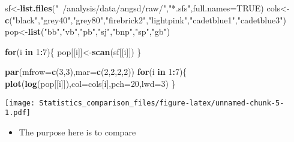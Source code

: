 \documentclass[]{article}
\newenvironment{Shaded}{\begin{snugshade}}{\end{snugshade}}
\newcommand{\KeywordTok}[1]{\textcolor[rgb]{0.13,0.29,0.53}{\textbf{#1}}}
\newcommand{\DataTypeTok}[1]{\textcolor[rgb]{0.13,0.29,0.53}{#1}}
\newcommand{\DecValTok}[1]{\textcolor[rgb]{0.00,0.00,0.81}{#1}}
\newcommand{\StringTok}[1]{\textcolor[rgb]{0.31,0.60,0.02}{#1}}
\newcommand{\OtherTok}[1]{\textcolor[rgb]{0.56,0.35,0.01}{#1}}
\newcommand{\ControlFlowTok}[1]{\textcolor[rgb]{0.13,0.29,0.53}{\textbf{#1}}}
\newcommand{\OperatorTok}[1]{\textcolor[rgb]{0.81,0.36,0.00}{\textbf{#1}}}
\newcommand{\NormalTok}[1]{#1}
\providecommand{\tightlist}{%
  \setlength{\itemsep}{0pt}\setlength{\parskip}{0pt}}
\begin{document}
\begin{Shaded}
\begin{Highlighting}[]
\NormalTok{sf<-}\KeywordTok{list.files}\NormalTok{(}\StringTok{"~/analysis/data/angsd/raw/"}\NormalTok{,}\StringTok{"*.sfs"}\NormalTok{,}\DataTypeTok{full.names=}\OtherTok{TRUE}\NormalTok{)}
\NormalTok{cols<-}\KeywordTok{c}\NormalTok{(}\StringTok{"black"}\NormalTok{,}\StringTok{"grey40"}\NormalTok{,}\StringTok{"grey80"}\NormalTok{,}\StringTok{"firebrick2"}\NormalTok{,}\StringTok{"lightpink"}\NormalTok{,}\StringTok{"cadetblue1"}\NormalTok{,}\StringTok{"cadetblue3"}\NormalTok{)}
\NormalTok{pop<-}\KeywordTok{list}\NormalTok{(}\StringTok{"bb"}\NormalTok{,}\StringTok{"vb"}\NormalTok{,}\StringTok{"pb"}\NormalTok{,}\StringTok{"sj"}\NormalTok{,}\StringTok{"bnp"}\NormalTok{,}\StringTok{"sp"}\NormalTok{,}\StringTok{"gb"}\NormalTok{)}

\ControlFlowTok{for}\NormalTok{(i }\ControlFlowTok{in} \DecValTok{1}\OperatorTok{:}\DecValTok{7}\NormalTok{)\{}
\NormalTok{  pop[[i]]<-}\KeywordTok{scan}\NormalTok{(sf[[i]])}
\NormalTok{\}}

\KeywordTok{par}\NormalTok{(}\DataTypeTok{mfrow=}\KeywordTok{c}\NormalTok{(}\DecValTok{3}\NormalTok{,}\DecValTok{3}\NormalTok{),}\DataTypeTok{mar=}\KeywordTok{c}\NormalTok{(}\DecValTok{2}\NormalTok{,}\DecValTok{2}\NormalTok{,}\DecValTok{2}\NormalTok{,}\DecValTok{2}\NormalTok{))}
\ControlFlowTok{for}\NormalTok{(i }\ControlFlowTok{in} \DecValTok{1}\OperatorTok{:}\DecValTok{7}\NormalTok{)\{}
  \KeywordTok{plot}\NormalTok{(}\KeywordTok{log}\NormalTok{(pop[[i]]),}\DataTypeTok{col=}\NormalTok{cols[i],}\DataTypeTok{pch=}\DecValTok{20}\NormalTok{,}\DataTypeTok{lwd=}\DecValTok{3}\NormalTok{)}
\NormalTok{\}}
\end{Highlighting}
\end{Shaded}

\texttt{[image: Statistics\_comparison\_files/figure-latex/unnamed-chunk-5-1.pdf]}

\begin{itemize}
\tightlist
\item
  The purpose here is to compare
\end{itemize}
\end{document}
